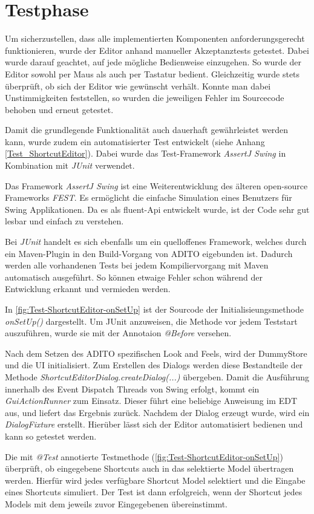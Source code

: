 \section{Testphase}

Um sicherzustellen, dass alle implementierten Komponenten anforderungsgerecht funktionieren, wurde der Editor anhand manueller Akzeptanztests getestet. Dabei wurde darauf geachtet, auf jede mögliche Bedienweise einzugehen. So wurde der Editor sowohl per Maus als auch per Tastatur bedient. Gleichzeitig wurde stets überprüft, ob sich der Editor wie gewünscht verhält. Konnte man dabei Unstimmigkeiten feststellen, so wurden die jeweiligen Fehler im Sourcecode behoben und erneut getestet.

Damit die grundlegende Funktionalität auch dauerhaft gewährleistet werden kann, wurde zudem ein automatisierter Test entwickelt (siehe Anhang \ref{Test_ShortcutEditor}). Dabei wurde das Test-Framework \emph{AssertJ Swing} in Kombination mit \emph{JUnit} verwendet.

Das Framework \emph{AssertJ Swing} ist eine Weiterentwicklung des älteren open-source Frameworks \emph{FEST}. Es ermöglicht die einfache Simulation eines Benutzers für Swing Applikationen. Da es als fluent-Api entwickelt wurde, ist der Code sehr gut lesbar und einfach zu verstehen.

Bei \emph{JUnit} handelt es sich ebenfalls um ein quelloffenes Framework, welches durch ein Maven-Plugin in den Build-Vorgang von ADITO eigebunden ist. Dadurch werden alle vorhandenen Tests bei jedem Kompiliervorgang mit Maven automatisch ausgeführt. So können etwaige Fehler schon während der Entwicklung erkannt und vermieden werden.



In \autoref{fig:Test-ShortcutEditor-onSetUp} ist der Sourcode der Initialisieungsmethode \emph{onSetUp()} dargestellt. Um JUnit anzuweisen, die Methode vor jedem Teststart auszuführen, wurde sie mit der Annotaion \emph{@Before} versehen. 

\vspace{10px}

Nach dem Setzen des ADITO spezifischen Look and Feels, wird der DummyStore und die UI initialisiert. Zum Erstellen des Dialogs werden diese Bestandteile der Methode \emph{ShortcutEditorDialog.createDialog(...)} übergeben. Damit die Ausführung innerhalb des Event Dispatch Threads von Swing erfolgt, kommt ein \emph{GuiActionRunner} zum Einsatz. Dieser führt eine beliebige Anweisung im EDT aus, und liefert das Ergebnis zurück. Nachdem der Dialog erzeugt wurde, wird ein \emph{DialogFixture} erstellt. Hierüber lässt sich der Editor automatisiert bedienen und kann so getestet werden.



Die mit \emph{@Test} annotierte Testmethode (\autoref{fig:Test-ShortcutEditor-onSetUp}) überprüft, ob eingegebene Shortcuts auch in das selektierte Model übertragen werden. Hierfür wird jedes verfügbare Shortcut Model selektiert und die Eingabe eines Shortcuts simuliert. Der Test ist dann erfolgreich, wenn der Shortcut jedes Models mit dem jeweils zuvor Eingegebenen übereinstimmt.
\newpage